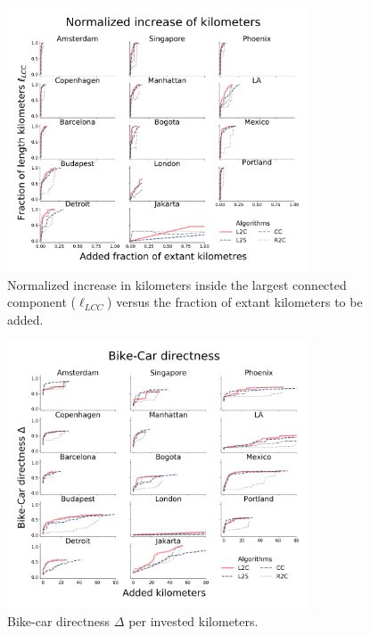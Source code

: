 \begin{figure}[h!]
  \centering
  \includegraphics[width=0.8\textwidth]{images/datadriven/SI_Lengths_Bike-Streets_FractionKM.pdf}
  \caption{Normalized increase in kilometers inside the largest connected component ($\ell_{LCC}$) versus the fraction of extant kilometers to be added.}
  \label{fig:Lengthsncrease_norm}
\end{figure}

\begin{figure}[h!]
  \centering
  \includegraphics[width=0.8\textwidth]{images/datadriven/SI_Directness.png}
  \caption{Bike-car directness $\Delta$ per invested kilometers.}
  \label{fig:Directness}
\end{figure}

